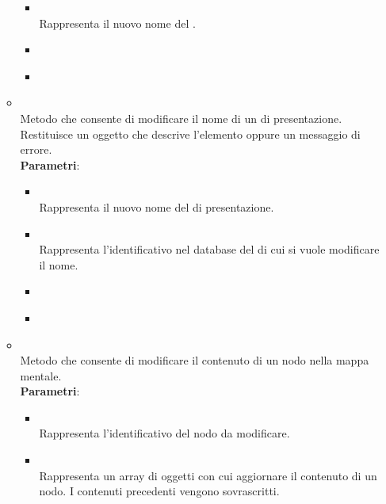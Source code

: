 \begin{itemize}
\begin{itemize}
\begin{itemize}
\item {}
\\ Rappresenta il nuovo nome del .
\item {}
\\ \dpCallback
\item {}
\\ \dpErrBack
\end{itemize}
\item {}
\\ Metodo che consente di modificare il nome di un  di presentazione. Restituisce un oggetto  che descrive l’elemento oppure un messaggio di errore.
\\ \textbf{Parametri}:
\begin{itemize}
\item {}
\\ Rappresenta il nuovo nome del  di presentazione.
\item {}
\\ Rappresenta l'identificativo nel database del  di cui si vuole modificare il nome.
\item {}
\\ \dpCallback
\item {}
\\ \dpErrBack
\end{itemize}
\item {}
\\ Metodo che consente di modificare il contenuto di un nodo nella mappa mentale.
\\ \textbf{Parametri}:
\begin{itemize}
\item {}
\\ Rappresenta l’identificativo del nodo da modificare.
\item {}
\\ Rappresenta un array di oggetti  con cui aggiornare il contenuto di un nodo. I contenuti precedenti vengono sovrascritti.

\end{itemize}
\end{itemize}
\end{itemize}
